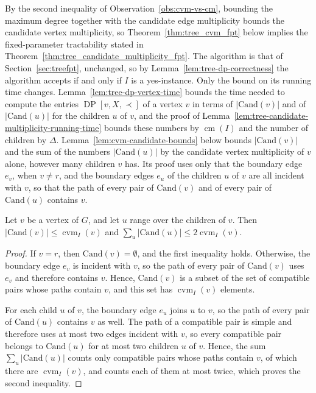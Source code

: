 \documentclass[a4paper,USenglish,thm-restate]{lipics-v2021}
\newcommand{\cm}{\operatorname{cm}}
\newcommand{\cvm}{\operatorname{cvm}}
\newcommand{\cand}{\mathrm{Cand}}
\theoremstyle{problemstyle}
\begin{document}
By the second inequality of Observation~\ref{obs:cvm-vs-cm}, bounding the maximum degree together with the candidate edge multiplicity bounds the candidate vertex multiplicity, so Theorem~\ref{thm:tree_cvm_fpt} below implies the fixed-parameter tractability stated in Theorem~\ref{thm:tree_candidate_multiplicity_fpt}. The algorithm is that of Section~\ref{sec:treefpt}, unchanged, so by Lemma~\ref{lem:tree-dp-correctness} the algorithm accepts if and only if $I$ is a yes-instance. Only the bound on its running time changes. Lemma~\ref{lem:tree-dp-vertex-time} bounds the time needed to compute the entries $\operatorname{DP}[v,X,\prec]$ of a vertex $v$ in terms of $|\cand(v)|$ and of $|\cand(u)|$ for the children $u$ of $v$, and the proof of Lemma~\ref{lem:tree-candidate-multiplicity-running-time} bounds these numbers by $\cm(I)$ and the number of children by $\Delta$. Lemma~\ref{lem:cvm-candidate-bounds} below bounds $|\cand(v)|$ and the sum of the numbers $|\cand(u)|$ by the candidate vertex multiplicity of $v$ alone, however many children $v$ has. Its proof uses only that the boundary edge $e_v$, when $v\neq r$, and the boundary edges $e_u$ of the children $u$ of $v$ are all incident with $v$, so that the path of every pair of $\cand(v)$ and of every pair of $\cand(u)$ contains $v$.

\begin{lemma}\label{lem:cvm-candidate-bounds}
Let $v$ be a vertex of $G$, and let $u$ range over the children of $v$. Then $|\cand(v)|\le\cvm_I(v)$ and $\sum_u|\cand(u)|\le 2\cvm_I(v)$.
\end{lemma}

\begin{proof}
If $v=r$, then $\cand(v)=\emptyset$, and the first inequality holds. Otherwise, the boundary edge $e_v$ is incident with $v$, so the path of every pair of $\cand(v)$ uses $e_v$ and therefore contains $v$. Hence, $\cand(v)$ is a subset of the set of compatible pairs whose paths contain $v$, and this set has $\cvm_I(v)$ elements.

For each child $u$ of $v$, the boundary edge $e_u$ joins $u$ to $v$, so the path of every pair of $\cand(u)$ contains $v$ as well. The path of a compatible pair is simple and therefore uses at most two edges incident with $v$, so every compatible pair belongs to $\cand(u)$ for at most two children $u$ of $v$. Hence, the sum $\sum_u|\cand(u)|$ counts only compatible pairs whose paths contain $v$, of which there are $\cvm_I(v)$, and counts each of them at most twice, which proves the second inequality.
\end{proof}
\end{document}
